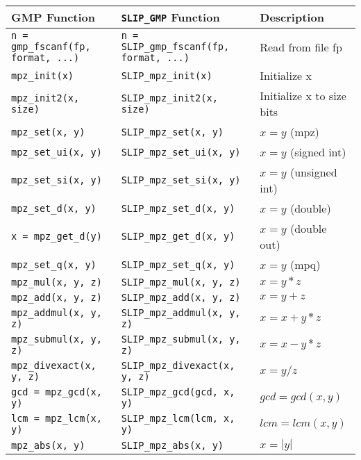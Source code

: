 \documentclass[12pt]{article}
\theoremstyle{definition}
\begin{document}
{\begin{center}
\begin{tabular}{|l|l|l|}
% 
% 
\hline
GMP Function & \verb|SLIP_GMP| Function & Description \\
\hline\hline
\verb|n = gmp_fscanf(fp, format, ...)|
    & \verb|n = SLIP_gmp_fscanf(fp, format, ...)|
    & Read from file fp \\ \hline
\verb|mpz_init(x)|
    & \verb|SLIP_mpz_init(x)|
    & Initialize x \\ \hline
\verb|mpz_init2(x, size)|
    & \verb|SLIP_mpz_init2(x, size)|
    & Initialize x to size bits \\ \hline
\verb|mpz_set(x, y)|
    & \verb|SLIP_mpz_set(x, y)| 
    & $x = y$ (mpz) \\ \hline
\verb|mpz_set_ui(x, y)|
    & \verb|SLIP_mpz_set_ui(x, y)|
    & $x = y$ (signed int) \\ \hline
\verb|mpz_set_si(x, y)|
    & \verb|SLIP_mpz_set_si(x, y)|
    & $x = y$ (unsigned int) \\ \hline
\verb|mpz_set_d(x, y)|
    & \verb|SLIP_mpz_set_d(x, y)|
    & $x = y$ (double)\\ \hline
\verb|x = mpz_get_d(y)|
    & \verb|SLIP_mpz_get_d(x, y)|
    & $x = y$ (double out) \\ \hline
\verb|mpz_set_q(x, y)|
    & \verb|SLIP_mpz_set_q(x, y)|
    & $x = y$ (mpq) \\ \hline
\verb|mpz_mul(x, y, z)|
    & \verb|SLIP_mpz_mul(x, y, z)|
    & $x = y*z$ \\ \hline
\verb|mpz_add(x, y, z)|
    & \verb|SLIP_mpz_add(x, y, z)|
    & $x = y+z$ \\ \hline
\verb|mpz_addmul(x, y, z)|
    & \verb|SLIP_mpz_addmul(x, y, z)|
    & $x = x+y*z$ \\ \hline
\verb|mpz_submul(x, y, z)|
    & \verb|SLIP_mpz_submul(x, y, z)|
    & $x = x-y*z$ \\ \hline
\verb|mpz_divexact(x, y, z)|
    & \verb|SLIP_mpz_divexact(x, y, z)|
    & $x = y/z$ \\ \hline
\verb|gcd = mpz_gcd(x, y)|
    & \verb|SLIP_mpz_gcd(gcd, x, y)|
    & $gcd = gcd(x,y)$\\ \hline
\verb|lcm = mpz_lcm(x, y)|
    & \verb|SLIP_mpz_lcm(lcm, x, y)|
    & $lcm = lcm(x,y)$ \\ \hline
\verb|mpz_abs(x, y)|
    & \verb|SLIP_mpz_abs(x, y)|
    & $x = |y|$ \\ \hline

\end{tabular}
\end{center}}
\end{document}
